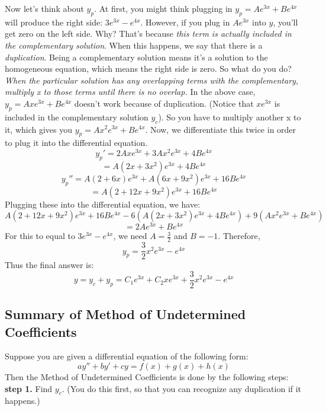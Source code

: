 \documentclass[12pt]{report}
\begin{document}
Now let's think about $y_p$. At first, you might think plugging in $y_p = A e^{3x} + B e^{4x}$ will produce the right side: $3 e^{3x}- e^{4x}$. However, if you plug in $ A e^{3x}$ into $y$, you'll get zero on the left side. Why? That's because \textit{this term is actually included in the complementary solution}. When this happens, we say that there is a \textit{duplication}. Being a complementary solution means it's a solution to the homogeneous equation, which means the right side is zero.
So what do you do? \textit{When the particular solution has any overlapping terms with the complementary, multiply x to those terms until there is no overlap.}
In the above case, $y_p = A x e^{3x} + B e^{4x}$ doesn't work because of duplication. (Notice that $x e^{3x}$ is included in the complementary solution $y_c$). So you have to multiply another x to it, which gives you $y_p = A x^2 e^{3x} + B e^{4x}$. Now, we differentiate this twice in order to plug it into the differential equation.
$$y_p' = 2Axe^{3x} + 3A x^2 e^{3x} + 4B e^{4x}$$
$$ = A(2x+3x^2)e^{3x}+4Be^{4x}$$
$$y_p'' = A(2+6x)e^{3x}+ A(6x+9x^2)e^{3x} + 16Be^{4x}$$
$$=A(2+12x+9x^2)e^{3x}+16Be^{4x}$$
Plugging these into the differential equation, we have:
$$A(2+12x+9x^2)e^{3x} + 16B e^{4x} - 6(A(2x+3x^2)e^{3x}+4Be^{4x})+ 9(A x^2 e^{3x} + B e^{4x})$$
$$= 2Ae^{3x}+Be^{4x}$$
For this to equal to $3 e^{3x}- e^{4x}$, we need $A=\frac{3}{2}$ and $B=-1$.
Therefore,
$$y_p = \frac{3}{2} x^2 e^{3x} - e^{4x}$$
Thus the final answer is:
$$y= y_c+y_p = C_1 e^{3x} + C_2 x e^{3x}+\frac{3}{2} x^2 e^{3x} - e^{4x}$$

\subsection*{Summary of Method of Undetermined Coefficients}
Suppose you are given a differential equation of the following form:
$$ay''+by'+cy = f(x) + g(x) + h(x)$$
Then the Method of Undetermined Coefficients is done by the following steps:\\

\textbf{step 1.} Find $y_c$. (You do this first, so that you can recognize any duplication if it happens.)\\
\end{document}
